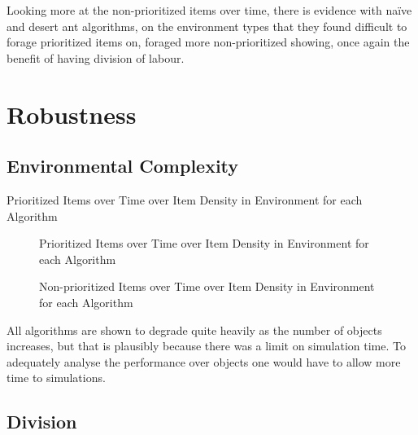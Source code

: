 Looking more at the non-prioritized items over time, there is evidence with na\"ive and desert ant algorithms, on the environment types that they found difficult to forage prioritized items on, foraged more non-prioritized showing, once again the benefit of having division of labour. %

\section{Robustness}
\label{results:robustness}


\subsection{Environmental Complexity}
\label{results:environmentcomplexity}


\begin{table} [h]
     \caption{Prioritized Items over Time over Item Density in Environment for each Algorithm}
     \label{ratio}
	\centering
	\footnotesize
	
\end{table}

\begin{figure}[!htb]
\centering
\resizebox{\textwidth}{!}{}
\caption{Prioritized Items over Time over Item Density in Environment  for each Algorithm}
\label{objectgoldplot}
\end{figure}


\begin{figure}[!htb]
\centering
\resizebox{\textwidth}{!}{}
\caption{Non-prioritized Items over Time over Item Density in Environment for each Algorithm}
\label{objectgoldplot}
\end{figure}

All algorithms are shown to degrade quite heavily as the number of objects increases, but that is plausibly because there was a limit on simulation time. To adequately analyse the performance over objects one would have to allow more time to simulations. 

\subsection{Division}
\label{results:division}

